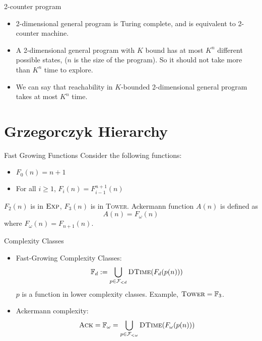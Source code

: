 \documentclass{beamer}
\begin{document}
\begin{frame}{2-counter program}
    \begin{itemize}
        \item 2-dimensional general program is Turing complete, and is equivalent to 2-counter machine.
        \item A 2-dimensional general program with $K$ bound has at most $K^{n}$ different possible states, ($n$ is the size of the program). So it should not take more than $K^n$ time to explore.
        \item We can say that reachability in $K$-bounded 2-dimensional general program takes at most $K^n$ time.
    \end{itemize}
\end{frame}



\section{Grzegorczyk Hierarchy}

\begin{frame}{Fast Growing Functions}
    Consider the following functions:
    \begin{itemize}
        \item $F_0(n) = n+1$
        \item For all $i \geq 1$,
        $F_i(n) = F^{n+1}_{i-1}(n)$
    \end{itemize}
    $F_2(n)$ is in $\textsc{Exp}$, $F_3(n)$ is in \textsc{Tower}.
\vfill
    Ackermann function $A(n)$ is defined as 
    $$A(n) = F_\omega(n)$$
    where $F_\omega(n) = F_{n+1}(n)$.
\end{frame}

\begin{frame}{Complexity Classes}
   \begin{itemize}
       \item Fast-Growing Complexity Classes:
       $$\mathbb{F}_d := \bigcup_{p \in \mathcal{F}_{< d}} \textsc{DTime}(F_d(p(n))) $$
       $p$ is a function in lower complexity classes. Example, $\textsc{Tower} = \mathbb{F}_3$.
       \item Ackermann complexity: $$\textsc{Ack} = \mathbb{F}_\omega = \bigcup_{p \in \mathcal{F}_{< \omega}} \textsc{DTime}(F_\omega(p(n)))$$

   \end{itemize}
\end{frame}
\end{document}
